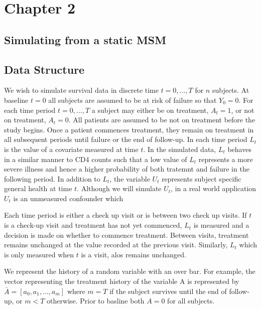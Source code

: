 \documentclass[11pt]{article}
\begin{document}
    \section{Chapter 2}\label{chapter-2}

\subsection{Simulating from a static
MSM}\label{simulating-from-a-static-msm}

\subsection{Data Structure}\label{data-structure}

We wish to simulate survival data in discrete time \(t = 0, \dots, T\)
for \(n\) subjects. At baseline \(t=0\) all subjects are assumed to be
at risk of failure so that \(Y_0 = 0\). For each time period
\(t = 0, \dots, T\) a subject may either be on treatment, \(A_t = 1\),
or not on treatment, \(A_t = 0\). All patients are assumed to be not on
treatment before the study begins. Once a patient commences treatment,
they remain on treatment in all subsequent periods until failure or the
end of follow-up. In each time period \(L_t\) is the value of a
covariate measured at time \(t\). In the simulated data, \(L_t\) behaves
in a similar manner to CD4 counts such that a low value of \(L_t\)
represents a more severe illness and hence a higher probability of both
tratemnt and failure in the following period. In addition to \(L_t\),
the variable \(U_t\) represents subject specific general health at time
\(t\). Although we will simulate \(U_t\), in a real world application
\(U_t\) is an unmeasured confounder which

Each time period is either a check up visit or is between two check up
visits. If \(t\) is a check-up visit and treatment has not yet
commenced, \(L_t\) is measured and a decision is made on whether to
commence treatment. Between visits, treatment remains unchanged at the
value recorded at the previous visit. Similarly, \(L_t\) which is only
measured when \(t\) is a visit, alos remains unchanged.

We represent the history of a random variable with an over bar. For
example, the vector representing the treatment history of the variable A
is represented by \(\bar A = [a_0, a_1, \dots, a_m]\) where \(m=T\) if
the subject survives until the end of follow-up, or \(m < T\) otherwise.
Prior to basline both \(A = 0\) for all subjects.
\end{document}
